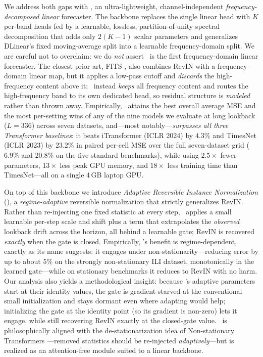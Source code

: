 We address both gaps with \method, an ultra-lightweight, channel-independent
\emph{frequency-decomposed linear} forecaster. The backbone replaces the single
linear head with $K$ per-band heads fed by a learnable, lossless,
partition-of-unity spectral decomposition that adds only $2(K{-}1)$ scalar
parameters and generalizes DLinear's fixed moving-average split into a learnable
frequency-domain split. We are careful not to overclaim: we do \emph{not} assert
\method\ is the first frequency-domain linear forecaster. The closest prior art,
FITS \citep{xu2024fits}, also combines RevIN with a frequency-domain linear map,
but it applies a low-pass cutoff and \emph{discards} the high-frequency content
above it; \method\ instead \emph{keeps} all frequency content and routes the
high-frequency band to its own dedicated head, so residual structure is
\emph{modeled} rather than thrown away. Empirically, \method\ attains the best
overall average MSE and the most per-setting wins of any of the nine models we
evaluate at long lookback ($L{=}336$) across seven datasets, and---most
notably---\emph{surpasses all three Transformer baselines}: it beats
iTransformer \citep{liu2024itransformer} (ICLR 2024) by $\mathbf{4.3\%}$ and
TimesNet \citep{wu2023timesnet} (ICLR 2023) by $\mathbf{23.2\%}$ in paired
per-cell MSE over the full seven-dataset grid ($6.9\%$ and $20.8\%$ on the five
standard benchmarks), while using $2.5\times$ fewer parameters, $13\times$ less
peak GPU memory, and $18\times$ less training time than TimesNet---all on a
single 4\,GB laptop GPU.

On top of this backbone we introduce \emph{Adaptive Reversible Instance
Normalization} (\arevin), a \emph{regime-adaptive} reversible normalization that
strictly generalizes RevIN. Rather than re-injecting one fixed statistic at every
step, \arevin\ applies a small learnable per-step scale and shift plus a term that
extrapolates the \emph{observed} lookback drift across the horizon, all behind a
learnable gate; RevIN is recovered \emph{exactly} when the gate is closed.
Empirically, \arevin's benefit is regime-dependent, exactly as its name suggests:
it engages under non-stationarity---reducing error by up to about $5\%$ on the
strongly non-stationary ILI dataset, monotonically in the learned gate---while on
stationary benchmarks it reduces to RevIN with no harm. Our analysis also yields a
methodological insight: because \arevin's adaptive parameters start at their
identity values, the gate is gradient-starved at the conventional small
initialization and stays dormant even where adapting would help; initializing the
gate at the identity point (so its gradient is non-zero) lets it engage, while
still recovering RevIN exactly at the closed-gate value. \arevin\ is
philosophically aligned with the de-stationarization idea of Non-stationary
Transformers \citep{liu2022nonstationary}---removed statistics should be
re-injected \emph{adaptively}---but is realized as an attention-free module suited
to a linear backbone.

